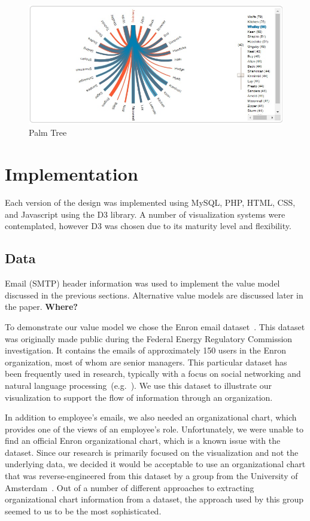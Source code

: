 \documentclass[journal]{vgtc}                %
\begin{document}
\begin{figure}
	\centering
	\includegraphics[width=\columnwidth]{pictures/palmtree.jpg}
	\caption{Palm Tree}
	\label{fig:palm}
\end{figure}

\section{Implementation}
\label{sec:implementation}
Each version of the design was implemented using MySQL, PHP, HTML, CSS, and Javascript using the D3 library.  A number of visualization systems were contemplated, however D3 was chosen due to its maturity level and flexibility.

\subsection{Data}
Email (SMTP) header information was used to implement the value model discussed in the previous sections.  Alternative value models are discussed later in the paper. \textbf{{\color{Plum}Where?}}

To demonstrate our value model we chose the Enron email dataset~\cite{cmuenron,klimt2004introducing}. This dataset was originally made public during the Federal Energy Regulatory Commission investigation.  It contains the emails of approximately 150 users in the Enron organization, most of whom are senior managers.  This particular dataset has been frequently used in research, typically with a focus on social networking and natural language processing~(e.g.~\cite{diesner2005exploration}). We use this dataset to illustrate our visualization to support the flow of information through an organization.  

In addition to employee's emails, we also needed an organizational chart, which provides one of the views of an employee's role.  Unfortunately, we were unable to find an official Enron organizational chart, which is a known issue with the dataset.  Since our research is primarily focused on the visualization and not the underlying data, we decided it would be acceptable to use an organizational chart that was reverse-engineered from this dataset by a group from the University of Amsterdam~\cite{rowe2007automated}. Out of a number of different approaches to extracting organizational chart information from a dataset, the approach used by this group seemed to us to be the most sophisticated.
\end{document}
